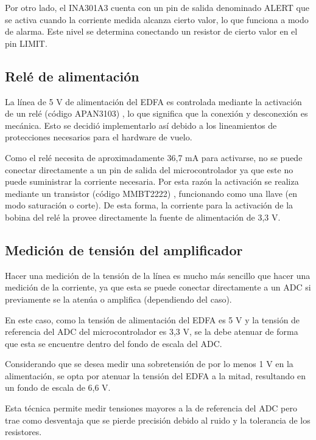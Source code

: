 Por otro lado, el INA301A3 cuenta con un pin de salida denominado ALERT que se activa cuando la corriente medida alcanza cierto valor, lo que funciona a modo de alarma. Este nivel se determina conectando un resistor de cierto valor en el pin LIMIT.

\subsection{Relé de alimentación}

La línea de 5 V de alimentación del EDFA es controlada mediante la activación de un relé (código APAN3103) \citep{WEBSITE:RELE_DS}, lo que significa que la conexión y desconexión es mecánica. Esto se decidió implementarlo así debido a los lineamientos de protecciones necesarios para el hardware de vuelo.

Como el relé necesita de aproximadamente 36,7 mA para activarse, no se puede conectar directamente a un pin de salida del microcontrolador ya que este no puede suministrar la corriente necesaria. Por esta razón la activación se realiza mediante un transistor (código MMBT2222) \citep{WEBSITE:TRANS_DS}, funcionando como una llave (en modo saturación o corte). De esta forma, la corriente para la activación de la bobina del relé la provee directamente la fuente de alimentación de 3,3 V.

\subsection{Medición de tensión del amplificador}

Hacer una medición de la tensión de la línea es mucho más sencillo que hacer una medición de la corriente, ya que esta se puede conectar directamente a un ADC si previamente se la atenúa o amplifica (dependiendo del caso).

En este caso, como la tensión de alimentación del EDFA es 5 V y la tensión de referencia del ADC del microcontrolador es 3,3 V, se la debe atenuar de forma que esta se encuentre dentro del fondo de escala del ADC.

Considerando que se desea medir una sobretensión de por lo menos 1 V en la alimentación, se opta por atenuar la tensión del EDFA a la mitad, resultando en un fondo de escala de 6,6 V.

Esta técnica permite medir tensiones mayores a la de referencia del ADC pero trae como desventaja que se pierde precisión debido al ruido y la tolerancia de los resistores.

